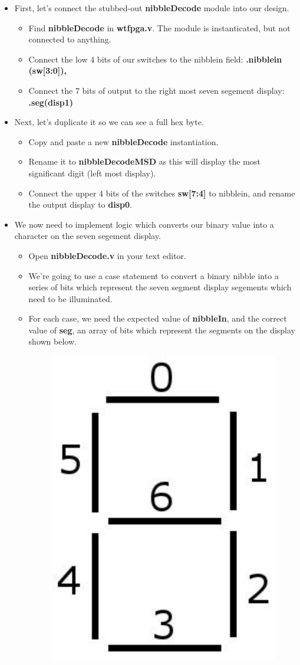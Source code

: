 \documentclass[12pt,a4paper]{article}
\begin{document}
\begin{itemize}
	\item First, let's connect the stubbed-out \textbf{nibbleDecode} module into our design. 
	\begin{itemize}
		\item Find \textbf{nibbleDecode} in \textbf{wtfpga.v}. The module is instanticated, but not connected to anything. 
		\item Connect the low 4 bits of our switches to the nibblein field: \textbf{.nibblein 	(sw[3:0]),}
		\item Connect the 7 bits of output to the right most seven segement display: \textbf{.seg(disp1)}
	\end{itemize}
	\item Next, let's duplicate it so we can see a full hex byte.
	\begin{itemize}
		\item Copy and paste a new \textbf{nibbleDecode} instantiation. 
		\item Rename it to \textbf{nibbleDecodeMSD} as this will display the most significant digit (left most display).
		\item Connect the upper 4 bits of the switches \textbf{sw[7:4]} to nibblein, and rename the output display to \textbf{disp0}.
	\end{itemize}
	\item We now need to implement logic which converts our binary value into a character on the seven segement display.
	\begin{itemize}
		\item Open \textbf{nibbleDecode.v} in your text editor. 
		\item We're going to use a case statement to convert a binary nibble into a series of bits which represent the seven segment display segements which need to be illuminated. 
		\item For each case, we need the expected value of \textbf{nibbleIn}, and the correct value of \textbf{seg}, an array of bits which represent the segments on the display shown below.
		\begin{figure}[H]
		\begin{center}
			\includegraphics[width=0.25\linewidth]{segments.png}

\end{center}
\end{figure}
\end{itemize}
\end{itemize}
\end{document}
